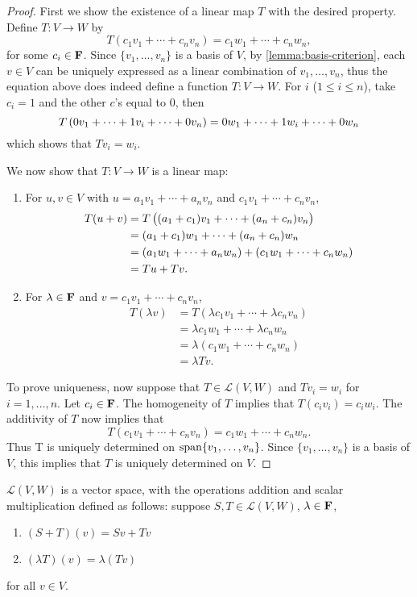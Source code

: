 \begin{proof}
First we show the existence of a linear map $T$ with the desired property. Define $T:V\to W$ by
\[T(c_1v_1+\cdots+c_nv_n)=c_1w_1+\cdots+c_nw_n,\]
for some $c_i\in\mathbf F$. Since $\{v_1,\dots,v_n\}$ is a basis of $V$, by \cref{lemma:basis-criterion}, each $v\in V$ can be uniquely expressed as a linear combination of $v_1,\dots,v_n$, thus the equation above does indeed define a function $T:V\to W$. For $i$ ($1\le i\le n$), take $c_i=1$ and the other $c$'s equal to $0$, then
\[T\left(0v_1+\cdots+1v_i+\cdots+0v_n\right)=0w_1+\cdots+1w_i+\cdots+0w_n\]
which shows that $Tv_i=w_i$.

We now show that $T:V\to W$ is a linear map:
\begin{enumerate}[label=(\roman*)]
\item For $u,v\in V$ with $u=a_1v_1+\cdots+a_nv_n$ and $c_1v_1+\cdots+c_nv_n$,
\begin{align*}
T(u+v)&=T\left((a_1+c_1)v_1+\cdots+(a_n+c_n)v_n\right)\\
&=(a_1+c_1)w_1+\cdots+(a_n+c_n)w_n\\
&=(a_1w_1+\cdots+a_nw_n)+(c_1w_1+\cdots+c_nw_n)\\
&=Tu+Tv.
\end{align*}

\item For $\lambda\in\mathbf F$ and $v=c_1v_1+\cdots+c_nv_n$,
\begin{align*}
T(\lambda v)&=T(\lambda c_1v_1+\cdots+\lambda c_nv_n)\\
&=\lambda c_1w_1+\cdots+\lambda c_nw_n\\
&=\lambda(c_1w_1+\cdots+c_nw_n)\\
&=\lambda Tv.
\end{align*}
\end{enumerate}

To prove uniqueness, now suppose that $T\in\mathcal{L}(V,W)$ and $Tv_i=w_i$ for $i=1,\dots,n$. Let $c_i\in\mathbf F$. The homogeneity of $T$ implies that $T(c_iv_i)=c_iw_i$. The additivity of $T$ now implies that 
\[T(c_1v_1+\cdots+c_nv_n)=c_1w_1+\cdots+c_nw_n.\]
Thus T is uniquely determined on $\operatorname{span}\{v_1,\dots,v_n\}$. Since $\{v_1,\dots,v_n\}$ is a basis of $V$, this implies that $T$ is uniquely determined on $V$.
\end{proof}

\begin{proposition}
$\mathcal{L}(V,W)$ is a vector space, with the operations addition and scalar multiplication defined as follows: suppose $S,T\in\mathcal{L}(V,W)$, $\lambda\in\mathbf F$,
\begin{enumerate}[label=(\roman*)]
\item $(S+T)(v)=Sv+Tv$
\item $(\lambda T)(v)=\lambda(Tv)$
\end{enumerate}
for all $v\in V$.
\end{proposition}

